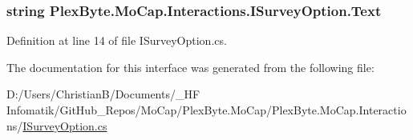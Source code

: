 \subsubsection[{\texorpdfstring{Text}{Text}}]{\setlength{\rightskip}{0pt plus 5cm}string Plex\+Byte.\+Mo\+Cap.\+Interactions.\+I\+Survey\+Option.\+Text\hspace{0.3cm}{\ttfamily [get]}}\hypertarget{interface_plex_byte_1_1_mo_cap_1_1_interactions_1_1_i_survey_option_a49da68b97f711aa9708ad94b512a8be9}{}\label{interface_plex_byte_1_1_mo_cap_1_1_interactions_1_1_i_survey_option_a49da68b97f711aa9708ad94b512a8be9}


Definition at line 14 of file I\+Survey\+Option.\+cs.



The documentation for this interface was generated from the following file\+:\begin{DoxyCompactItemize}
\item 
D\+:/\+Users/\+Christian\+B/\+Documents/\+\_\+\+H\+F Infomatik/\+Git\+Hub\+\_\+\+Repos/\+Mo\+Cap/\+Plex\+Byte.\+Mo\+Cap/\+Plex\+Byte.\+Mo\+Cap.\+Interactions/\hyperlink{_i_survey_option_8cs}{I\+Survey\+Option.\+cs}\end{DoxyCompactItemize}
